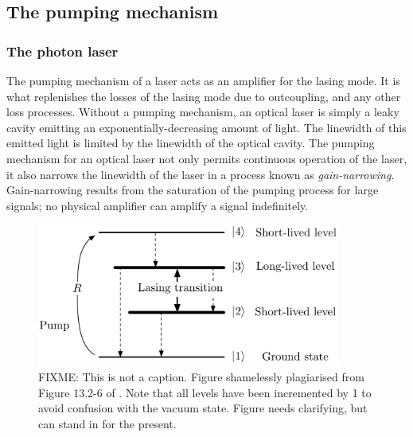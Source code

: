 % 
% 

\subsection{The pumping mechanism}
\label{Introduction:ThePumpingMechanism}

\subsubsection{The photon laser}

The pumping mechanism of a laser acts as an amplifier for the lasing mode.  It is what replenishes the losses of the lasing mode due to outcoupling, and any other loss processes.  Without a pumping mechanism, an optical laser is simply a leaky cavity emitting an exponentially-decreasing amount of light.  The linewidth of this emitted light is limited by the linewidth of the optical cavity.  The pumping mechanism for an optical laser not only permits continuous operation of the laser, it also narrows the linewidth of the laser in a process known as \emph{gain-narrowing}.  Gain-narrowing results from the saturation of the pumping process for large signals; no physical amplifier can amplify a signal indefinitely.  

\begin{figure}
    \centering
    \includegraphics[width=10cm]{4LevelOpticalLaserModel}
    \caption{
        \label{Introduction:4LevelOpticalLaserModel}
        FIXME: This is not a caption.  Figure shamelessly plagiarised from Figure 13.2-6 of \citep{SalehTeich}.  Note that all levels have been incremented by 1 to avoid confusion with the vacuum state.  Figure needs clarifying, but can stand in for the present.
    }
\end{figure}

